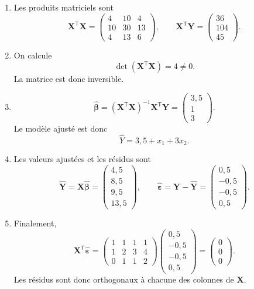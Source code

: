 \documentclass[letter, 11pt]{article}
\newcommand{\bY}{\mathbf{Y}}
\newcommand{\bX}{\mathbf{X}}
\newcommand{\bbeta}{\boldsymbol{\beta}}
\newcommand{\bepsilon}{\boldsymbol{\varepsilon}}
\newcommand{\trans}{^{\mathsf T}}
\begin{document}
\begin{enumerate}[leftmargin=*, wide, label=\bf Exercice \arabic*:]
{\begin{enumerate}[label=\alph*)]
  \item Les produits matriciels sont
        \[
        \bX\trans\bX=
        \begin{pmatrix}
          4&10&4\\
          10&30&13\\
          4&13&6
        \end{pmatrix},
        \qquad
        \bX\trans\bY=
        \begin{pmatrix}36\\104\\45\end{pmatrix}.
        \]

  \item On calcule
        \[
          \det(\bX\trans\bX)=4\neq0.
        \]
        La matrice est donc inversible. 

  \item 
        \[
        \widehat{\bbeta}
        =(\bX\trans\bX)^{-1}\bX\trans\bY
        =\begin{pmatrix}3{,}5\\1\\3\end{pmatrix}.
        \]
        Le modèle ajusté est donc
        \[
          \widehat{Y}=3{,}5+x_1+3x_2.
        \]

  \item Les valeurs ajustées et les résidus sont
        \[
        \widehat{\bY}=\bX\widehat{\bbeta}
        =\begin{pmatrix}4{,}5\\8{,}5\\9{,}5\\13{,}5\end{pmatrix},
        \qquad
        \widehat{\bepsilon}=\bY-\widehat{\bY}
        =\begin{pmatrix}0{,}5\\-0{,}5\\-0{,}5\\0{,}5\end{pmatrix}.
        \]

  \item Finalement,
        \[
        \bX\trans\widehat{\bepsilon}
        =\begin{pmatrix}
          1&1&1&1\\
          1&2&3&4\\
          0&1&1&2
        \end{pmatrix}
        \begin{pmatrix}0{,}5\\-0{,}5\\-0{,}5\\0{,}5\end{pmatrix}
        =\begin{pmatrix}0\\0\\0\end{pmatrix}.
        \]
        Les résidus sont donc orthogonaux à chacune des colonnes de $\bX$.
\end{enumerate}
}


\end{enumerate}
\end{document}
